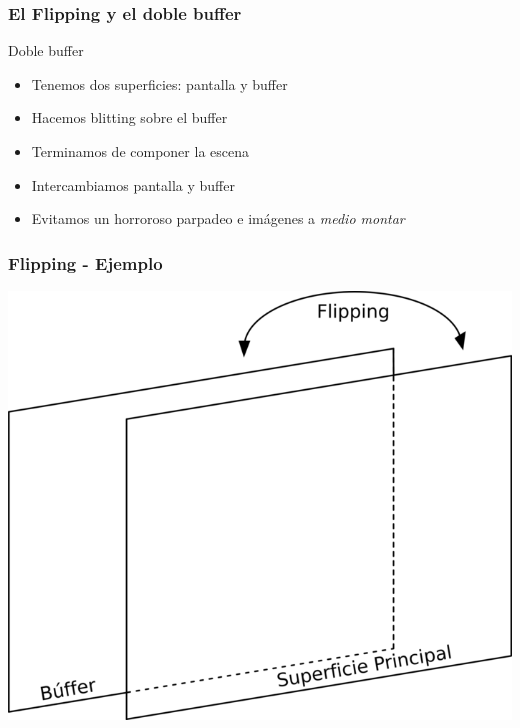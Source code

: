 \begin{frame}
    \frametitle{El Flipping y el doble buffer}
    
	\begin{block}{Doble buffer}
        \begin{itemize}
            \item Tenemos dos superficies: pantalla y buffer
            \item Hacemos blitting sobre el buffer
            \item Terminamos de componer la escena
            \item Intercambiamos pantalla y buffer
            \item Evitamos un horroroso parpadeo e imágenes a \emph{medio montar}
        \end{itemize}            
    \end{block}
    
\end{frame}

\begin{frame}
    \frametitle{Flipping - Ejemplo}

    \begin{center}
		\includegraphics[scale=2]{img/flipping.png}
	\end{center}
    
\end{frame}
